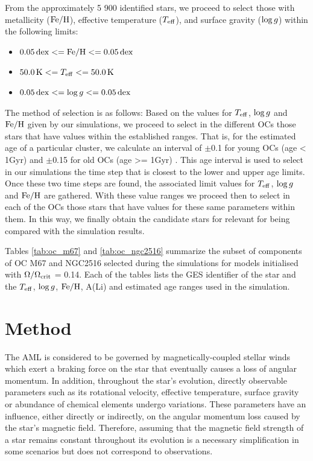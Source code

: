\documentclass[fleqn,usenatbib]{mnras}
\begin{document}
From the approximately 5 900 identified stars, we proceed to select those with metallicity ($\mathrm{Fe}/\mathrm{H}$), effective temperature ($T_{\mathrm{eff}}$), and surface gravity ($\mathrm{log} \, g$) within the following limits:
\begin{itemize}
    \item $0.05 \, \mathrm{dex} <= \mathrm{Fe}/\mathrm{H} <= 0.05 \, \mathrm{dex}$
    \item $50.0 \, \mathrm{K} <= T_{\mathrm{eff}} <= 50.0 \, \mathrm{K}$
    \item $0.05 \, \mathrm{dex} <= \mathrm{log} \, g <= 0.05 \, \mathrm{dex}$
\end{itemize}

The method of selection is as follows: Based on the values for $T_{\mathrm{eff}}$, $\mathrm{log} \, g$ and $\mathrm{Fe}/\mathrm{H}$ given by our simulations, we proceed to select in the different OCs those stars that have values within the established ranges. That is, for the estimated age of a particular cluster, we calculate an interval of $\pm$0.1 for young OCs (age < 1Gyr) and $\pm$0.15 for old OCs (age >= 1Gyr) \citep[see][and reference values therein]{Cantat-Gaudin2020}. This age interval is used to select in our simulations the time step that is closest to the lower and upper age limits. Once these two time steps are found, the associated limit values for $T_{\mathrm{eff}}$, $\mathrm{log} \, g$ and $\mathrm{Fe}/\mathrm{H}$ are gathered. With these value ranges we proceed then to select in each of the OCs those stars that have values for these same parameters within them. In this way, we finally obtain the candidate stars for relevant for being compared with the simulation results.\par

Tables \ref{tab:oc_m67} and \ref{tab:oc_ngc2516} summarize the subset of components of OC M67 and NGC2516 selected during the simulations for models initialised with $\Omega / \Omega_{\mathrm{crit}}$ = 0.14. Each of the tables lists the GES identifier of the star and the $T_{\mathrm{eff}}$, $\mathrm{log} \, g$, $\mathrm{Fe}/\mathrm{H}$, A(Li) and estimated age ranges used in the simulation.

\section{Method} \label{sec_method}
The AML is considered to be governed by magnetically-coupled stellar winds which exert a braking force on the star that eventually causes a loss of angular momentum. In addition, throughout the star's evolution, directly observable parameters such as its rotational velocity, effective temperature, surface gravity or abundance of chemical elements undergo variations. These parameters have an influence, either directly or indirectly, on the angular momentum loss caused by the star's magnetic field. Therefore, assuming that the magnetic field strength of a star remains constant throughout its evolution is a necessary simplification in some scenarios but does not correspond to observations.\par
\end{document}

